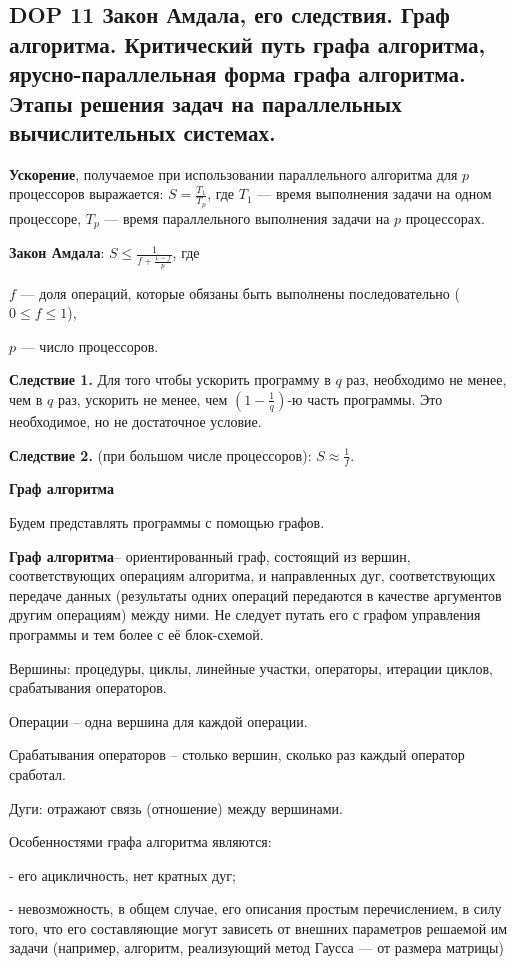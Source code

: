 \subsection*{DOP 11 Закон Амдала, его следствия. Граф алгоритма. Критический путь графа алгоритма, ярусно-параллельная форма графа алгоритма. Этапы решения задач на параллельных вычислительных системах.}


\textbf{Ускорение}, получаемое при использовании параллельного алгоритма для $p$ процессоров выражается: $S = \frac{T_1}{T_p}$, где $T_1$ --- время выполнения задачи на одном процессоре, $T_p$ --- время параллельного выполнения задачи на $p$ процессорах.

\textbf{Закон Амдала}:
$S \leqslant \frac{1}{f + \frac{1 - f}{p}}$, где

$f$ --- доля операций, которые обязаны быть выполнены последовательно ($0 \leqslant f \leqslant 1$),

$p$ --- число процессоров.

\textbf{Следствие 1.}
Для того чтобы ускорить программу в $q$ раз, необходимо не менее, чем в $q$ раз, ускорить не менее, чем $\left(1 - \frac{1}{q}\right)$-ю часть программы. Это необходимое, но не достаточное условие.

\textbf{Следствие 2.} (при большом числе процессоров):
$S \approx \frac{1}{f}$.

\textbf{Граф алгоритма}

Будем представлять программы с помощью графов.

\textbf{Граф алгоритма}-- ориентированный граф, состоящий из вершин, соответствующих операциям алгоритма, и направленных дуг, соответствующих передаче данных (результаты одних операций передаются в качестве аргументов другим операциям) между ними. Не следует путать его с графом управления программы и тем более с её блок-схемой.

Вершины: процедуры, циклы, линейные участки, операторы, итерации циклов, срабатывания операторов.

Операции -- одна вершина для каждой операции.

Срабатывания операторов -- столько вершин, сколько раз каждый оператор сработал.

Дуги: отражают связь (отношение) между вершинами.

Особенностями графа алгоритма являются:

 - его ацикличность, нет кратных дуг;

 - невозможность, в общем случае, его описания простым перечислением, в силу того, что его составляющие могут зависеть от внешних параметров решаемой им задачи (например, алгоритм, реализующий метод Гаусса — от размера матрицы)

